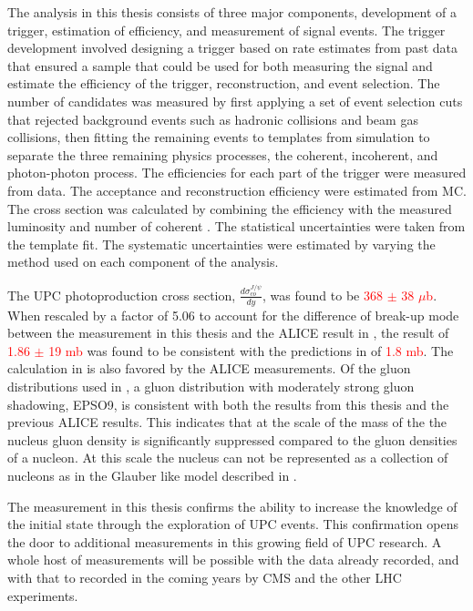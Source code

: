     The analysis in this thesis consists of three major components, development
      of a trigger, estimation of efficiency, and measurement of signal events.
    The trigger development involved designing a trigger based on rate estimates
      from past data that ensured a sample that could be used for both measuring
      the signal and estimate the efficiency of the trigger, reconstruction, and
      event selection.
    The number of \JPsi{} candidates was measured by first applying a set 
      of event selection cuts that rejected background events such as hadronic
      collisions and beam gas collisions, then fitting the remaining events to
      templates from simulation to separate the three remaining physics processes,
      the coherent, incoherent, and photon-photon process.
    The efficiencies for each part of the trigger were measured from data. 
    The acceptance and reconstruction efficiency were estimated from MC.
    The cross section was calculated by combining the efficiency with the 
      measured luminosity and number of coherent \JPsi{}.
    The statistical uncertainties were taken from the template fit.
    The systematic uncertainties were estimated by varying the method used on 
      each component of the analysis. 
  
    The UPC \JPsi{} photoproduction cross section, $\frac{d\sigma^{J/\psi}_{co}}{dy}$,
      was found to be \textcolor{red}{368 $\pm$ 38 $\mu$b}. 
    When rescaled by a factor of 5.06 to account for the difference of break-up mode between 
      the measurement in this thesis and the ALICE result in \cite{alice2012.09}, the 
      result of \textcolor{red}{1.86 $\pm$ 19 mb} was found to be consistent with the 
      predictions in \cite{pQCD2013.02} of \textcolor{red}{1.8 mb}.  
    The calculation in \cite{pQCD2013.02} is also favored by the ALICE measurements. 
    Of the gluon distributions used in \cite{pQCD2013.02}, a gluon distribution with 
      moderately strong gluon shadowing, EPSO9, is consistent with both the results from this
      thesis and the previous ALICE results. 
    This indicates that at the scale of the mass of the \JPsi{} the nucleus gluon density is 
      significantly suppressed compared to the gluon densities of a nucleon.
    At this scale the nucleus can not be represented as a collection of nucleons as in the 
      Glauber like model described in \cite{vmd1999}.
  
    The measurement in this thesis confirms the ability to increase the knowledge of the 
      initial state through the exploration of UPC events. 
    This confirmation opens the door to additional measurements in this growing field of UPC
      research.
    A whole host of measurements will be possible with the data already recorded,
      and with that to recorded in the coming years by CMS and the other LHC 
      experiments. 
\fi
